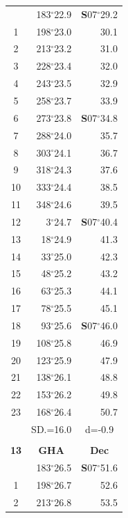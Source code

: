 \documentclass[10pt, a4paper]{report}
\begin{document}
\begin{scriptsize}
\begin{tabular*}{0.2\textwidth}[t]{@{\extracolsep{\fill}}|c|rr|}
\hline\rule{0pt}{2.6ex}\noindent
0 & 183$^\circ$22.9 & \textbf{S}07$^\circ$29.2\\
1 & 198$^\circ$23.0 & 30.1\\
2 & 213$^\circ$23.2 & 31.0\\
3 & 228$^\circ$23.4 & \raisebox{0.24ex}{\boldmath$\cdot$~\boldmath$\cdot$~~}32.0\\
4 & 243$^\circ$23.5 & 32.9\\
5 & 258$^\circ$23.7 & 33.9\\[2Pt]
6 & 273$^\circ$23.8 & \textbf{S}07$^\circ$34.8\\
7 & 288$^\circ$24.0 & 35.7\\
8 & 303$^\circ$24.1 & 36.7\\
9 & 318$^\circ$24.3 & \raisebox{0.24ex}{\boldmath$\cdot$~\boldmath$\cdot$~~}37.6\\
10 & 333$^\circ$24.4 & 38.5\\
11 & 348$^\circ$24.6 & 39.5\\[2Pt]
12 & 3$^\circ$24.7 & \textbf{S}07$^\circ$40.4\\
13 & 18$^\circ$24.9 & 41.3\\
14 & 33$^\circ$25.0 & 42.3\\
15 & 48$^\circ$25.2 & \raisebox{0.24ex}{\boldmath$\cdot$~\boldmath$\cdot$~~}43.2\\
16 & 63$^\circ$25.3 & 44.1\\
17 & 78$^\circ$25.5 & 45.1\\[2Pt]
18 & 93$^\circ$25.6 & \textbf{S}07$^\circ$46.0\\
19 & 108$^\circ$25.8 & 46.9\\
20 & 123$^\circ$25.9 & 47.9\\
21 & 138$^\circ$26.1 & \raisebox{0.24ex}{\boldmath$\cdot$~\boldmath$\cdot$~~}48.8\\
22 & 153$^\circ$26.2 & 49.8\\
23 & 168$^\circ$26.4 & 50.7\\
\hline
\rule{0pt}{2.4ex} & \multicolumn{1}{c}{SD.=16.0} & \multicolumn{1}{c|}{d=-0.9}\\
\hline
\multicolumn{1}{c}{}\\[-0.5ex]\hline
\multicolumn{1}{|c|}{\rule{0pt}{2.6ex}\textbf{13}} & \multicolumn{1}{c}{\textbf{GHA}} & \multicolumn{1}{c|}{\textbf{Dec}}\\
\hline\rule{0pt}{2.6ex}\noindent
0 & 183$^\circ$26.5 & \textbf{S}07$^\circ$51.6\\
1 & 198$^\circ$26.7 & 52.6\\
2 & 213$^\circ$26.8 & 53.5\\

\end{tabular*}
\end{scriptsize}
\end{document}
